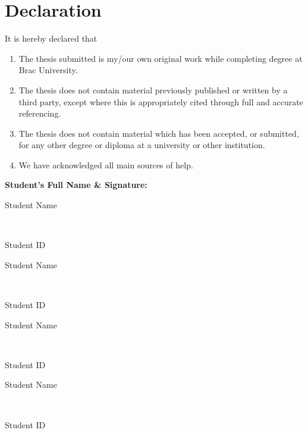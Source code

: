 \newcommand*\wildcard[2][6cm]{\vspace{2cm}\parbox{#1}{\hrulefill\par#2}} 


\section*{Declaration}

It is hereby declared that

\begin{enumerate} %
  \item The thesis submitted is my/our own original work while completing degree at Brac University.
  \item The thesis does not contain material previously published or written by a third party, except where this is appropriately cited through full and accurate referencing.
  \item The thesis does not contain material which has been accepted, or submitted, for any other degree or diploma at a university or other institution.
  \item We have acknowledged all main sources of help.
\end{enumerate}

\vspace{1cm}
\textbf{Student’s Full Name \& Signature:} %

\begingroup

    \begin{center}
        \wildcard{\centerline{Student Name} ~\\ \centerline{Student ID}} %
        \hspace{2cm} %
        \wildcard{\centerline{Student Name} ~\\ \centerline{Student ID} }
        \wildcard{\centerline{Student Name} ~\\ \centerline{Student ID} }
        \hspace{2cm}
        \wildcard{\centerline{Student Name} ~\\ \centerline{Student ID} }
    \end{center}

\endgroup


\pagebreak





